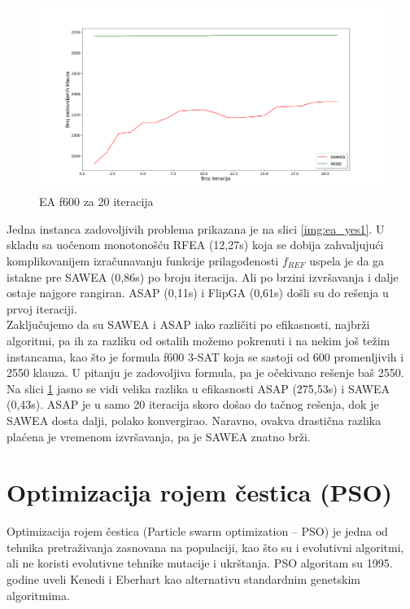 \documentclass[a4paper]{article}
\begin{document}
\begin{figure}[h!]
\centering
\includegraphics[width=\textwidth]{f600-sawea-asap.png}
\caption{EA f600 za 20 iteracija}\label{img:ea_f600}
\end{figure}

Jedna instanca zadovoljivih problema prikazana je na slici \ref{img:ea_yes1}.
U skladu sa uočenom monotonošću RFEA (12,27s) koja se dobija zahvaljujući komplikovanijem
izračunavanju funkcije prilagođenosti $f_{REF}$ uspela je da ga istakne pre 
SAWEA (0,86s) po broju iteracija. Ali po brzini
izvršavanja i dalje ostaje najgore rangiran. ASAP (0,11s) i FlipGA (0,61s) 
došli su do rešenja u prvoj iteraciji. \\

Zaključujemo da su SAWEA i ASAP iako različiti po efikasnosti, najbrži algoritmi, 
pa ih za razliku od ostalih možemo pokrenuti i na nekim još težim instancama, kao što 
je formula f600 3-SAT koja se sastoji od 600 promenljivih i 2550 klauza. U pitanju je 
zadovoljiva formula, pa je očekivano rešenje baš 2550. Na slici \ref{img:ea_f600}
jasno se vidi velika razlika u efikasnosti ASAP (275,53s) i SAWEA (0,43s).
ASAP je u samo 20 iteracija skoro došao do tačnog rešenja, dok je SAWEA dosta dalji,
polako konvergirao. Naravno, ovakva drastična razlika plaćena je vremenom izvršavanja,
pa je SAWEA znatno brži.



\newpage


\section{Optimizacija rojem čestica (PSO)}
\label{sec:pso}
Optimizacija rojem čestica (Particle swarm optimization – PSO) \cite{PSO_Russell} 
je jedna od tehnika pretraživanja zasnovana na populaciji, kao što su i 
evolutivni algoritmi, ali ne koristi evolutivne tehnike mutacije i ukrštanja.
PSO algoritam su 1995. godine uveli Kenedi i Eberhart kao 
alternativu standardnim genetskim algoritmima. \\
\end{document}
